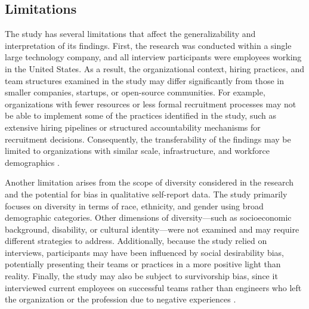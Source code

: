 \subsection{Limitations}
The study has several limitations that affect the generalizability and interpretation of its findings. First, the research was conducted within a single large technology company, and all interview participants were employees working in the United States. As a result, the organizational context, hiring practices, and team structures examined in the study may differ significantly from those in smaller companies, startups, or open-source communities. For example, organizations with fewer resources or less formal recruitment processes may not be able to implement some of the practices identified in the study, such as extensive hiring pipelines or structured accountability mechanisms for recruitment decisions. Consequently, the transferability of the findings may be limited to organizations with similar scale, infrastructure, and workforce demographics \cite{easterbrook2008selecting}.

Another limitation arises from the scope of diversity considered in the research and the potential for bias in qualitative self-report data. The study primarily focuses on diversity in terms of race, ethnicity, and gender using broad demographic categories. Other dimensions of diversity—such as socioeconomic background, disability, or cultural identity—were not examined and may require different strategies to address. Additionally, because the study relied on interviews, participants may have been influenced by social desirability bias, potentially presenting their teams or practices in a more positive light than reality. Finally, the study may also be subject to survivorship bias, since it interviewed current employees on successful teams rather than engineers who left the organization or the profession due to negative experiences \cite{nederhof1985methods}.